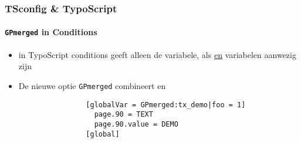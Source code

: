 
\begin{frame}[fragile]
	\frametitle{TSconfig \& TypoScript}
	\framesubtitle{\texttt{GPmerged} in Conditions}

	\begin{itemize}

		\item {} in TypoScript conditions geeft alleen de 
			variabele, als  \underline{en}
			 variabelen aanwezig zijn

		\item De nieuwe optie \texttt{GPmerged} combineert  en 

			\begin{lstlisting}
				[globalVar = GPmerged:tx_demo|foo = 1]
				  page.90 = TEXT
				  page.90.value = DEMO
				[global]
			\end{lstlisting}

	\end{itemize}

\end{frame}


